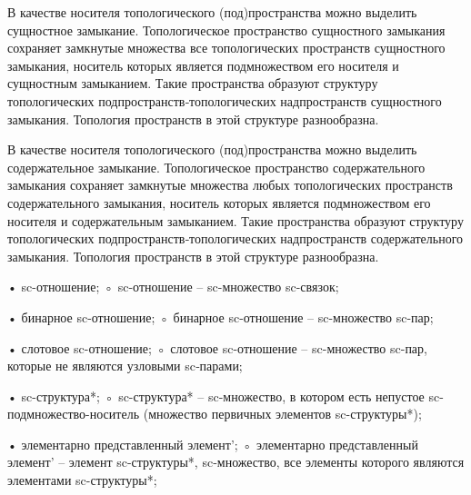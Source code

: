 \begin{SCn}
\end{SCn}

В качестве носителя топологического (под)пространства можно выделить сущностное замыкание. Топологическое пространство сущностного замыкания сохраняет замкнутые множества все топологических пространств сущностного замыкания, носитель которых является подмножеством его носителя и сущностным замыканием. Такие пространства образуют структуру топологических подпространств‑топологических надпространств сущностного замыкания. Топология пространств в этой структуре разнообразна.

\begin{SCn}
\end{SCn}

В качестве носителя топологического (под)пространства можно выделить содержательное замыкание. Топологическое пространство содержательного замыкания сохраняет замкнутые множества любых топологических пространств содержательного замыкания, носитель которых является подмножеством его носителя и содержательным замыканием. Такие пространства образуют структуру топологических подпространств‑топологических надпространств содержательного замыкания. Топология пространств в этой структуре разнообразна.

\begin{SCn}
\end{SCn}
• sc-отношение;
◦ sc-отношение – sc-множество sc-связок;

\begin{SCn}
\end{SCn}
• бинарное sc-отношение;
◦ бинарное sc-отношение – sc-множество sc-пар;

\begin{SCn}
\end{SCn}
• слотовое sc-отношение;
◦ слотовое sc-отношение – sc-множество sc-пар, которые не являются узловыми sc‑парами;

\begin{SCn}
\end{SCn}
    • sc-структура*;
◦ sc-структура* – sc-множество, в котором есть непустое sc-подмножество-носитель (множество первичных элементов sc-структуры*);

\begin{SCn}
\end{SCn}
• элементарно представленный элемент’;
◦ элементарно представленный элемент’ – элемент sc-структуры*, sc‑множество, все элементы которого являются элементами sc-структуры*;

